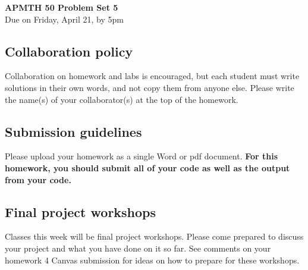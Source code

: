 \documentclass[12pt]{article}
\begin{document}
\begin{center}{\Large \bf{APMTH 50 Problem Set 5}} \vspace{0.2in}\\
{\large Due on Friday, April 21, by 5pm\\}
\end{center}

\subsection*{Collaboration policy}
Collaboration on homework and labs is
encouraged, but each student must write solutions in their own words, and not
copy them from anyone else.  Please write the name(s) of your collaborator(s) at the top of the homework.

\subsection*{Submission guidelines} Please upload your homework as a single Word or pdf document.   \textbf{For this homework, you should submit all of your code as well as the output from your code.}%
\subsection*{Final project workshops} 
Classes this week will be final project workshops.  Please come prepared to discuss your project and what you have done on it so far.  See comments on your homework 4 Canvas submission for ideas on how to  prepare for these workshops.
\end{document}
